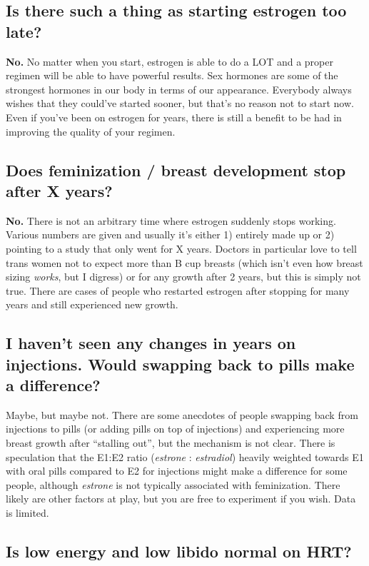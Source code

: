 \documentclass{article}
\begin{document}
\subsection{Is there such a thing as starting estrogen too late?}\label{11-5}

\textbf{No.} No matter when you start, estrogen is able to do a LOT and a proper regimen will be able to have powerful results. Sex hormones are some of the strongest hormones in our body in terms of our appearance. Everybody always wishes that they could’ve started sooner, but that’s no reason not to start now. Even if you’ve been on estrogen for years, there is still a benefit to be had in improving the quality of your regimen.

\subsection{Does feminization / breast development stop after X years?}\label{11-6}

\textbf{No.} There is not an arbitrary time where estrogen suddenly stops working. Various numbers are given and usually it’s either 1) entirely made up or 2) pointing to a study that only went for X years. Doctors in particular love to tell trans women not to expect more than B cup breasts (which isn’t even how breast sizing \textit{works}, but I digress) or for any growth after 2 years, but this is simply not true. There are cases of people who restarted estrogen after stopping for many years and still experienced new growth.

\subsection{I haven’t seen any changes in years on injections. Would swapping back to pills make a difference?}

Maybe, but maybe not. There are some anecdotes of people swapping back from injections to pills (or adding pills on top of injections) and experiencing more breast growth after “stalling out”, but the mechanism is not clear. There is speculation that the E1:E2 ratio (\textit{estrone} : \textit{estradiol}) heavily weighted towards E1 with oral pills compared to E2 for injections might make a difference for some people, although \textit{estrone} is not typically associated with feminization. There likely are other factors at play, but you are free to experiment if you wish. Data is limited.

\subsection{Is low energy and low libido normal on HRT?}
\end{document}
